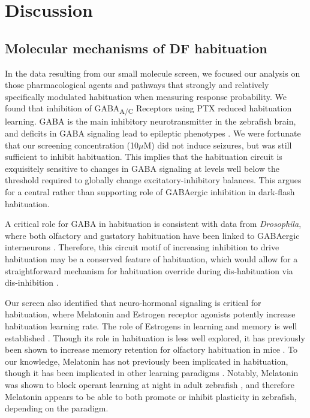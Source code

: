\documentclass[9pt,lineno]{RandlettLab_elife}
\begin{document}
\section{Discussion}
\subsection{Molecular mechanisms of DF habituation}

In the data resulting from our small molecule screen, we focused our analysis on those pharmacological agents and pathways that strongly and relatively specifically modulated habituation when measuring response probability. We found that inhibition of GABA\textsubscript{A/C} Receptors using PTX reduced habituation learning. GABA is the main inhibitory neurotransmitter in the zebrafish brain, and deficits in GABA signaling lead to epileptic phenotypes \citep{Baraban2005-xq}. We were fortunate that our screening concentration (10$\mu$M) did not induce seizures, but was still sufficient to inhibit habituation. This implies that the habituation circuit is exquisitely sensitive to changes in GABA signaling at levels well below the threshold required to globally change excitatory-inhibitory balances. This argues for a central rather than supporting role of GABAergic inhibition in dark-flash habituation. 

A critical role for GABA in habituation is consistent with data from \emph{Drosophila}, where both olfactory and gustatory habituation have been linked to GABAergic interneurons \citep{Das2011-gd, Paranjpe2012-ce,Trisal2022-pa}. Therefore, this circuit motif of increasing inhibition to drive habituation may be a conserved feature of habituation, which would allow for a straightforward mechanism for habituation override during dis-habituation via dis-inhibition \citep{Cooke2020-mz, Trisal2022-pa}. 

Our screen also identified that neuro-hormonal signaling is critical for habituation, where Melatonin and Estrogen receptor agonists potently increase habituation learning rate. The role of Estrogens in learning and memory is well established \citep{Luine1998-iz,Nilsson2002-fi}. Though its role in habituation is less well explored, it has previously been shown to increase memory retention for olfactory habituation in mice \citep{Dillon2013-ez}. To our knowledge, Melatonin has not previously been implicated in habituation, though it has been implicated in other learning paradigms \citep{El-Sherif2003-tv, Jilg2019-lq}. Notably, Melatonin was shown to block operant learning at night in adult zebrafish \citep{Rawashdeh2007-ts}, and therefore Melatonin appears to be able to both promote or inhibit plasticity in zebrafish, depending on the paradigm. 
\end{document}
